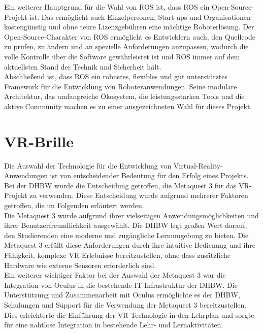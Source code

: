 \noindent
Ein weiterer Hauptgrund für die Wahl von \ac{ROS} ist, dass \ac{ROS} ein Open-Source-Projekt ist. Das ermöglicht auch Einzelpersonen, Start-ups und Organisationen kostengünstig und ohne teure Lizenzgebühren eine mächtige Roboterlösung. Der Open-Source-Charakter von \ac{ROS} ermöglicht es Entwicklern auch, den Quellcode zu prüfen, zu ändern und an spezielle Anforderungen anzupassen, wodurch die volle Kontrolle über die Software gewährleistet ist und \ac{ROS} immer auf dem aktuellsten Stand der Technik und Sicherheit hält.
\\

\noindent
Abschließend ist, dass \ac{ROS} ein robustes, flexibles und gut unterstütztes Framework für die Entwicklung von Roboteranwendungen. Seine modulare Architektur, das umfangreiche Ökosystem, die leistungsstarken Tools und die aktive Community machen es zu einer ausgezeichneten Wahl für dieses Projekt.\\




\section{VR-Brille}
Die Auswahl der Technologie für die Entwicklung von Virtual-Reality-Anwendungen ist von entscheidender Bedeutung für den Erfolg eines Projekts. Bei der DHBW wurde die Entscheidung getroffen, die Metaquest 3 für das VR-Projekt zu verwenden. Diese Entscheidung wurde aufgrund mehrerer Faktoren getroffen, die im Folgenden erläutert werden.
\\

\noindent
Die Metaquest 3 wurde aufgrund ihrer vielseitigen Anwendungsmöglichkeiten und ihrer Benutzerfreundlichkeit ausgewählt. Die DHBW legt großen Wert darauf, den Studierenden eine moderne und zugängliche Lernumgebung zu bieten. Die Metaquest 3 erfüllt diese Anforderungen durch ihre intuitive Bedienung und ihre Fähigkeit, komplexe VR-Erlebnisse bereitzustellen, ohne dass zusätzliche Hardware wie externe Sensoren erforderlich sind.
\\

\noindent
Ein weiterer wichtiger Faktor bei der Auswahl der Metaquest 3 war die Integration von Oculus in die bestehende IT-Infrastruktur der DHBW. Die Unterstützung und Zusammenarbeit mit Oculus ermöglichte es der DHBW, Schulungen und Support für die Verwendung der Metaquest 3 bereitzustellen. Dies erleichterte die Einführung der VR-Technologie in den Lehrplan und sorgte für eine nahtlose Integration in bestehende Lehr- und Lernaktivitäten.
\\

